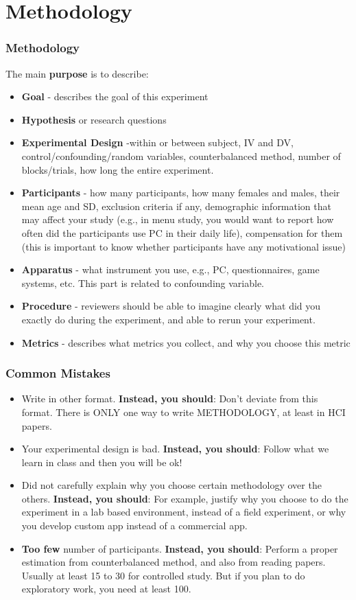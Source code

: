 \documentclass{beamer}
\begin{document}
\section{Methodology}

\begin{frame}
\footnotesize
\frametitle{Methodology} 
 The main \textbf{purpose} is to describe:
\begin{itemize}
	\item \textbf{Goal} - describes the goal of this experiment
	\item \textbf{Hypothesis} or research questions
	\item \textbf{Experimental Design} -within or between subject,  IV and DV,  control/confounding/random variables,  counterbalanced method,  number of blocks/trials, how long the entire experiment.
	\item \textbf{Participants} - how many participants, how many females and males, their mean age and SD, exclusion criteria if any,  demographic information that may affect your study (e.g., in menu study, you would want to report how often did the participants use PC in their daily life),  compensation for them (this is important to know whether participants have any motivational issue)
	\item \textbf{Apparatus} - what instrument you use, e.g., PC, questionnaires, game systems, etc.   This part is related to confounding variable.
	\item \textbf{Procedure} - reviewers should be able to imagine clearly what did you exactly do during the experiment, and able to rerun your experiment.
	\item \textbf{Metrics} - describes what metrics you collect, and why you choose this metric
\end{itemize}
\end{frame} 

\begin{frame}
\frametitle{Common Mistakes} 
\footnotesize
\begin{itemize}
	\item Write in other format.   \textbf{Instead, you should}:  Don't deviate from this format.   There is ONLY one way to write METHODOLOGY,  at least in HCI papers.
		\item Your experimental design is bad.   \textbf{Instead, you should}:   Follow what we learn in class and then you will be ok!
	\item Did not carefully explain why you choose certain methodology over the others.  \textbf{Instead, you should}:  For example, justify why you choose to do the experiment in a lab based environment, instead of a field experiment, or why you develop custom app instead of a commercial app.
	\item \textbf{Too few} number of participants.  \textbf{Instead, you should}: Perform a proper estimation from counterbalanced method, and also from reading papers.   Usually at least 15 to 30 for controlled study.   But if you plan to do exploratory work, you need at least 100.
\end{itemize}
\end{frame}
\end{document}
